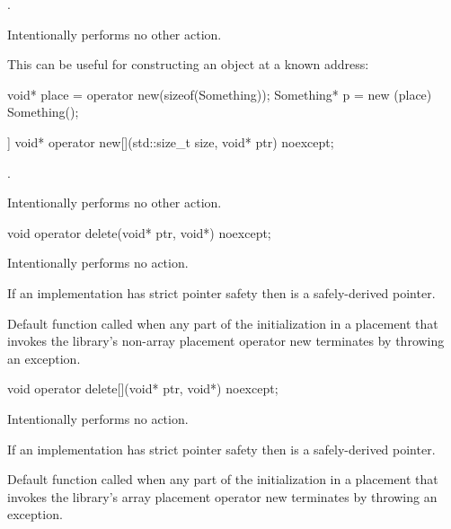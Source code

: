 \begin{itemdescr}
\pnum
\returns
{}.

\pnum
\remarks
Intentionally performs no other action.

\pnum
\begin{example}
This can be useful for constructing an object at a known address:

\begin{codeblock}
void* place = operator new(sizeof(Something));
Something* p = new (place) Something();
\end{codeblock}
\end{example}
\end{itemdescr}

%
\begin{itemdecl}
[[nodiscard]] void* operator new[](std::size_t size, void* ptr) noexcept;
\end{itemdecl}

\begin{itemdescr}
\pnum
\returns
{}.

\pnum
\remarks
Intentionally performs no other action.
\end{itemdescr}

%
\begin{itemdecl}
void operator delete(void* ptr, void*) noexcept;
\end{itemdecl}

\begin{itemdescr}
\pnum
\effects
Intentionally performs no action.

\pnum
\expects
If an implementation has strict pointer safety
then  is a safely-derived pointer.

\pnum
\remarks
Default function called when any part of the initialization in a
placement  that invokes the library's
non-array placement operator new
terminates by throwing an exception.
\end{itemdescr}

%
\begin{itemdecl}
void operator delete[](void* ptr, void*) noexcept;
\end{itemdecl}

\begin{itemdescr}
\pnum
\effects
Intentionally performs no action.

\pnum
\expects
If an implementation has strict pointer safety
then  is a safely-derived pointer.

\pnum
\remarks
Default function called when any part of the initialization in a
placement  that invokes the library's
array placement operator new
terminates by throwing an exception.
\end{itemdescr}


